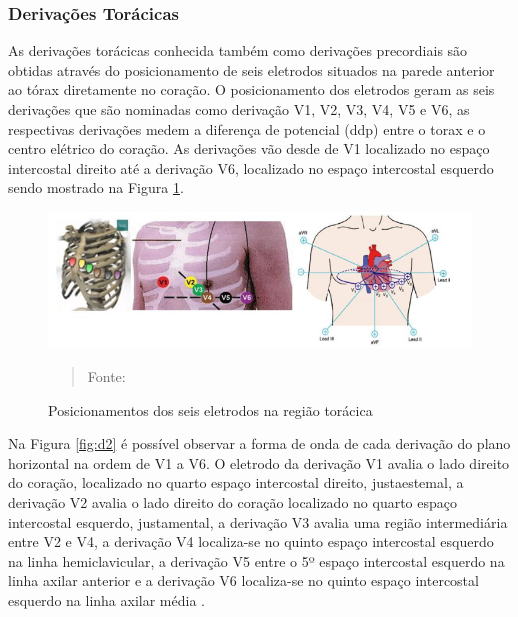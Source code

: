 \documentclass[12pt, a4paper]{article}
\begin{document}
\subsubsection{Derivações Torácicas}
\hspace*{0.8cm} As derivações torácicas conhecida também como derivações precordiais são obtidas através do posicionamento de seis eletrodos situados na parede anterior ao tórax diretamente no coração. O posicionamento dos eletrodos geram as seis derivações que são nominadas como derivação V1, V2, V3, V4, V5 e V6, as respectivas derivações medem a diferença de potencial (ddp) entre o torax e o centro elétrico do coração. 
As derivações vão desde de V1 localizado no espaço intercostal direito até a derivação V6, localizado no espaço intercostal esquerdo sendo mostrado na Figura \ref{fig:dop}.

\begin{figure}[H]
\begin{center}
			\caption{Posicionamentos dos seis eletrodos na região torácica}
			\includegraphics[width=1\textwidth]{Figuras/v6.PNG}
            \vspace*{\fill} 
            \begin{quote} 
            \centering 
            Fonte: \cite{ronald}
            \end{quote}
            \vspace*{\fill}
			\label{fig:dop}
\end{center}
\end{figure}


Na Figura \ref{fig:d2} é possível observar a forma de onda de cada derivação do plano horizontal na ordem de V1 a V6. O eletrodo da derivação V1 avalia o lado direito do coração, localizado no quarto espaço intercostal direito, justaestemal, a derivação V2 avalia o lado direito do coração localizado no quarto espaço intercostal esquerdo, justamental, a derivação V3 avalia uma região intermediária entre V2 e V4, a derivação V4 localiza-se no quinto espaço intercostal esquerdo na linha hemiclavicular, a derivação V5 entre o 5º espaço intercostal esquerdo na linha axilar anterior e a derivação V6 localiza-se no quinto espaço intercostal esquerdo na linha axilar média \cite{ronald}.
\end{document}
